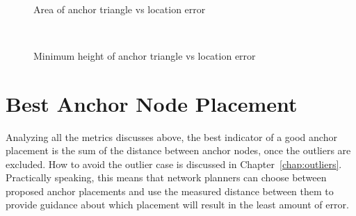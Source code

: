 \begin{figure}
  \centering
\\
	\caption{Area of anchor triangle vs location error}	
	\label{fig:AnchorArea}
\end{figure}

\begin{figure}
  \centering
		\\
	\caption{Minimum height of anchor triangle vs location error}	
	\label{fig:AnchorHeight}
\end{figure}

\section{Best Anchor Node Placement}

Analyzing all the metrics discusses above, the best indicator of a good anchor placement is the sum of the distance between anchor nodes, once the outliers are excluded.  How to avoid the outlier case is discussed in Chapter~\ref{chap:outliers}.  Practically speaking, this means that network planners can choose between proposed anchor placements and use the measured distance between them to provide guidance about which placement will result in the least amount of error. 